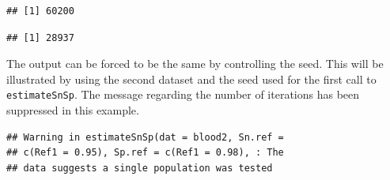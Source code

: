 \documentclass[
  12pt,
]{article}
\newenvironment{Shaded}{\begin{snugshade}}{\end{snugshade}}
\newcommand{\AttributeTok}[1]{\textcolor[rgb]{0.13,0.29,0.53}{#1}}
\newcommand{\ConstantTok}[1]{\textcolor[rgb]{0.56,0.35,0.01}{#1}}
\newcommand{\FloatTok}[1]{\textcolor[rgb]{0.00,0.00,0.81}{#1}}
\newcommand{\FunctionTok}[1]{\textcolor[rgb]{0.13,0.29,0.53}{\textbf{#1}}}
\newcommand{\NormalTok}[1]{#1}
\newcommand{\OtherTok}[1]{\textcolor[rgb]{0.56,0.35,0.01}{#1}}
\newcommand{\SpecialCharTok}[1]{\textcolor[rgb]{0.81,0.36,0.00}{\textbf{#1}}}
\begin{document}
\begin{Shaded}
\end{Shaded}

\begin{verbatim}
## [1] 60200
\end{verbatim}

\begin{Shaded}
\end{Shaded}

\begin{verbatim}
## [1] 28937
\end{verbatim}

The output can be forced to be the same by controlling the seed. This
will be illustrated by using the second dataset and the seed used for
the first call to \texttt{estimateSnSp}. The message regarding the
number of iterations has been suppressed in this example.

\begin{Shaded}
\end{Shaded}

\begin{verbatim}
## Warning in estimateSnSp(dat = blood2, Sn.ref =
## c(Ref1 = 0.95), Sp.ref = c(Ref1 = 0.98), : The
## data suggests a single population was tested
\end{verbatim}
\end{document}

